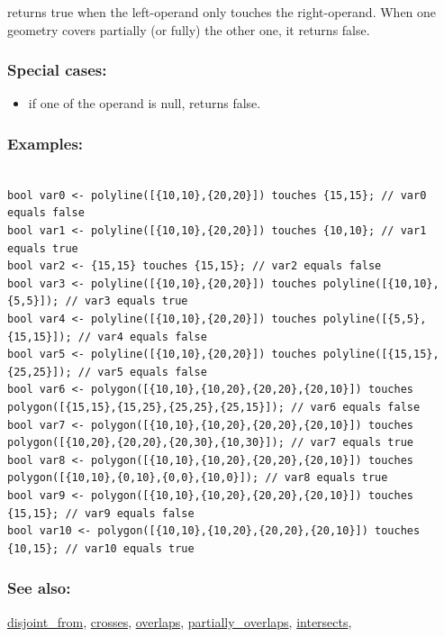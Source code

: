 \documentclass[]{book}
\providecommand{\tightlist}{%
  \setlength{\itemsep}{0pt}\setlength{\parskip}{0pt}}
\theoremstyle{definition}
\theoremstyle{definition}
\theoremstyle{definition}
\theoremstyle{remark}
\begin{document}
returns true when the left-operand only touches the right-operand. When
one geometry covers partially (or fully) the other one, it returns
false.

\subsubsection{Special cases:}\label{special-cases-139}

\begin{itemize}
\tightlist
\item
  if one of the operand is null, returns false.
\end{itemize}

\subsubsection{Examples:}\label{examples-364}

\begin{verbatim}
 
bool var0 <- polyline([{10,10},{20,20}]) touches {15,15}; // var0 equals false 
bool var1 <- polyline([{10,10},{20,20}]) touches {10,10}; // var1 equals true 
bool var2 <- {15,15} touches {15,15}; // var2 equals false 
bool var3 <- polyline([{10,10},{20,20}]) touches polyline([{10,10},{5,5}]); // var3 equals true 
bool var4 <- polyline([{10,10},{20,20}]) touches polyline([{5,5},{15,15}]); // var4 equals false 
bool var5 <- polyline([{10,10},{20,20}]) touches polyline([{15,15},{25,25}]); // var5 equals false 
bool var6 <- polygon([{10,10},{10,20},{20,20},{20,10}]) touches polygon([{15,15},{15,25},{25,25},{25,15}]); // var6 equals false 
bool var7 <- polygon([{10,10},{10,20},{20,20},{20,10}]) touches polygon([{10,20},{20,20},{20,30},{10,30}]); // var7 equals true 
bool var8 <- polygon([{10,10},{10,20},{20,20},{20,10}]) touches polygon([{10,10},{0,10},{0,0},{10,0}]); // var8 equals true 
bool var9 <- polygon([{10,10},{10,20},{20,20},{20,10}]) touches {15,15}; // var9 equals false 
bool var10 <- polygon([{10,10},{10,20},{20,20},{20,10}]) touches {10,15}; // var10 equals true
\end{verbatim}

\subsubsection{See also:}\label{see-also-207}

\href{operators-d-to-h.html\#disjoint_from}{disjoint\_from},
\href{operators-b-to-c.html\#crosses}{crosses},
\href{operators-n-to-r.html\#overlaps}{overlaps},
\href{operators-n-to-r.html\#partially_overlaps}{partially\_overlaps},
\href{operators-i-to-m.html\#intersects}{intersects},
\end{document}
